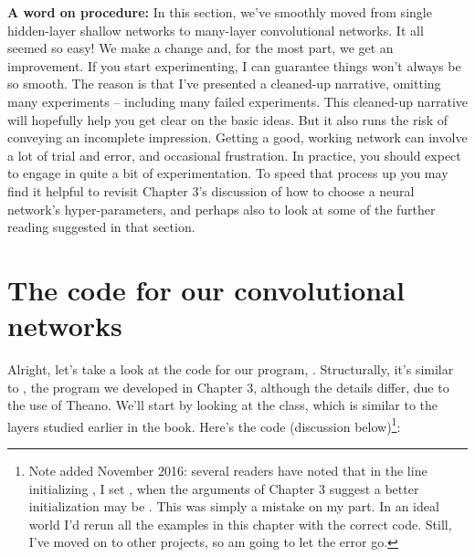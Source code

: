 \documentclass[a4paper,twoside,10pt]{book}
\begin{document}
\textbf{A word on procedure:} In this section, we've smoothly moved from single hidden-layer shallow networks to many-layer convolutional networks. It all seemed so easy! We make a change and, for the most part, we get an improvement. If you start experimenting, I can guarantee things won't always be so smooth. The reason is that I've presented a cleaned-up narrative, omitting many experiments -- including many failed experiments. This cleaned-up narrative will hopefully help you get clear on the basic ideas. But it also runs the risk of conveying an incomplete impression. Getting a good, working network can involve a lot of trial and error, and occasional frustration. In practice, you should expect to engage in quite a bit of experimentation. To speed that process up you may find it helpful to revisit Chapter 3's discussion of how to choose a neural network's hyper-parameters, and perhaps also to look at some of the further reading suggested in that section.

\section{The code for our convolutional networks}
Alright, let's take a look at the code for our program, . Structurally, it's similar to , the program we developed in Chapter 3, although the details differ, due to the use of Theano. We'll start by looking at the  class, which is similar to the layers studied earlier in the book. Here's the code (discussion below)\footnote{Note added November 2016: several readers have noted that in the line initializing , I set , when the arguments of Chapter 3 suggest a better initialization may be . This was simply a mistake on my part. In an ideal world I'd rerun all the examples in this chapter with the correct code. Still, I've moved on to other projects, so am going to let the error go.}:
\end{document}
